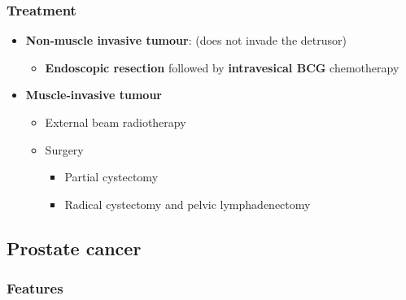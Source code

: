 \documentclass[
  14pt,
]{extarticle}
\providecommand{\tightlist}{%
  \setlength{\itemsep}{0pt}\setlength{\parskip}{0pt}}
\begin{document}
\hypertarget{treatment-6}{%
\subsubsection{Treatment}\label{treatment-6}}

\begin{itemize}
\tightlist
\item
  \textbf{Non-muscle invasive tumour}: (does not invade the detrusor)

  \begin{itemize}
  \tightlist
  \item
    \textbf{Endoscopic resection} followed by \textbf{intravesical BCG}
    chemotherapy
  \end{itemize}
\item
  \textbf{Muscle-invasive tumour}

  \begin{itemize}
  \tightlist
  \item
    External beam radiotherapy
  \item
    Surgery

    \begin{itemize}
    \tightlist
    \item
      Partial cystectomy
    \item
      Radical cystectomy and pelvic lymphadenectomy
    \end{itemize}
  \end{itemize}
\end{itemize}

\pagebreak

\hypertarget{prostate-cancer}{%
\subsection{Prostate cancer}\label{prostate-cancer}}

\hypertarget{features-7}{%
\subsubsection{Features}\label{features-7}}
\end{document}
